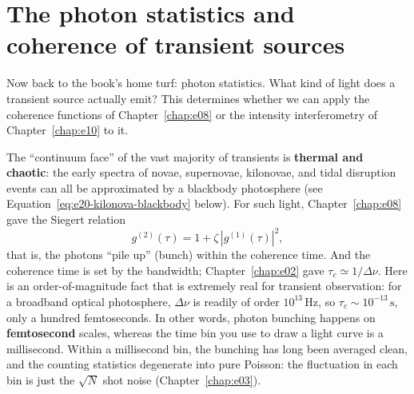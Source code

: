 \section{The photon statistics and coherence of transient sources}
\label{sec:e20-coherence}

Now back to the book's home turf: photon statistics. What kind of light does a transient source actually emit? This determines whether we can apply the coherence functions of Chapter~\ref{chap:e08} or the intensity interferometry of Chapter~\ref{chap:e10} to it.

The ``continuum face'' of the vast majority of transients is \textbf{thermal and chaotic}: the early spectra of novae, supernovae, kilonovae, and tidal disruption events can all be approximated by a blackbody photosphere (see Equation~\eqref{eq:e20-kilonova-blackbody} below). For such light, Chapter~\ref{chap:e08} gave the Siegert relation
\[
  g^{(2)}(\tau)=1+\zeta\,|g^{(1)}(\tau)|^2,
\]
that is, the photons ``pile up'' (bunch) within the coherence time. And the coherence time is set by the bandwidth; Chapter~\ref{chap:e02} gave \(\tau_c\simeq 1/\Delta\nu\). Here is an order-of-magnitude fact that is extremely real for transient observation: for a broadband optical photosphere, \(\Delta\nu\) is readily of order \(10^{13}\,\mathrm{Hz}\), so \(\tau_c\sim10^{-13}\,\mathrm{s}\), only a hundred femtoseconds. In other words, photon bunching happens on \textbf{femtosecond} scales, whereas the time bin you use to draw a light curve is a millisecond. Within a millisecond bin, the bunching has long been averaged clean, and the counting statistics degenerate into pure Poisson: the fluctuation in each bin is just the \(\sqrt N\) shot noise (Chapter~\ref{chap:e03}).


